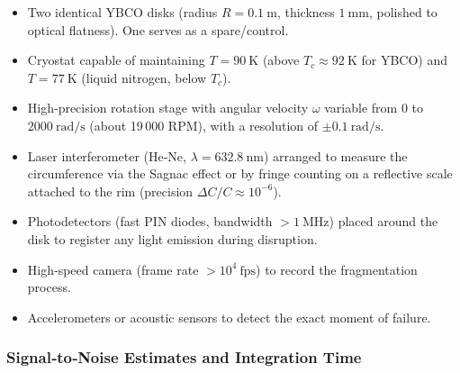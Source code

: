 \documentclass[12pt,a4paper]{article}
\begin{document}
\begin{itemize}
	\item Two identical YBCO disks (radius \(R = 0.1\ \text{m}\), thickness \(1\ \text{mm}\), polished to optical flatness). One serves as a spare/control.
	\item Cryostat capable of maintaining \(T = 90\ \text{K}\) (above \(T_c \approx 92\ \text{K}\) for YBCO) and \(T = 77\ \text{K}\) (liquid nitrogen, below \(T_c\)).
	\item High‑precision rotation stage with angular velocity \(\omega\) variable from 0 to \(2000\ \text{rad/s}\) (about 19 000 RPM), with a resolution of \(\pm 0.1\ \text{rad/s}\).
	\item Laser interferometer (He‑Ne, \(\lambda = 632.8\ \text{nm}\)) arranged to measure the circumference via the Sagnac effect or by fringe counting on a reflective scale attached to the rim (precision \(\Delta C/C \approx 10^{-6}\)).
	\item Photodetectors (fast PIN diodes, bandwidth \(> 1\ \text{MHz}\)) placed around the disk to register any light emission during disruption.
	\item High‑speed camera (frame rate \(> 10^4\ \text{fps}\)) to record the fragmentation process.
	\item Accelerometers or acoustic sensors to detect the exact moment of failure.
\end{itemize}

\subsubsection{Signal‑to‑Noise Estimates and Integration Time}
\end{document}

